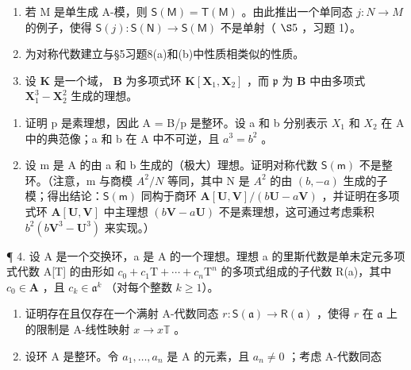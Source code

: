 \BourbakiExercisesSection

\begin{enumerate}
\def\labelenumi{\arabic{enumi}.}
\item
  若 M 是单生成 A-模，则 \(\mathsf{S}(\mathsf{M}) = \mathsf{T}(\mathsf{M})\) 。由此推出一个单同态 \(j: N \to M\) 的例子，使得 \(\mathsf{S}(j): \mathsf{S}(\mathsf{N}) \to \mathsf{S}(\mathsf{M})\) 不是单射（ \(\S 5\) ，习题 1）。
\item
  为对称代数建立与§5习题8(a)和(b)中性质相类似的性质。
\item
  设 \(\mathbf{K}\) 是一个域， \(\mathbf{B}\) 为多项式环 \(\mathbf{K}[\mathbf{X}_1, \mathbf{X}_2]\) ，而 \(\mathfrak{p}\) 为 \(\mathbf{B}\) 中由多项式 \(\mathbf{X}_1^3 - \mathbf{X}_2^2\) 生成的理想。
\end{enumerate}

\begin{enumerate}
\def\labelenumi{(\alph{enumi})}
\item
  证明 p 是素理想，因此 A = B/p 是整环。设 a 和 b 分别表示 \(X_{1}\) 和 \(X_{2}\) 在 A 中的典范像；a 和 b 在 A 中不可逆，且 \(a^{3} = b^{2}\) 。
\item
  设 m 是 A 的由 a 和 b 生成的（极大）理想。证明对称代数 \(\mathsf{S}(\mathsf{m})\) 不是整环。（注意，m 与商模 \(A^{2}/N\) 等同，其中 N 是 \(A^{2}\) 的由 \((b, -a)\) 生成的子模；得出结论：\(\mathsf{S}(\mathsf{m})\) 同构于商环 \(\mathbf{A}[\mathbf{U}, \mathbf{V}]/(b\mathbf{U} - a\mathbf{V})\) ，并证明在多项式环 \(\mathbf{A}[\mathbf{U}, \mathbf{V}]\) 中主理想 \((b\mathbf{V} - a\mathbf{U})\) 不是素理想，这可通过考虑乘积 \(b^{2}(b\mathbf{V}^{3} - \mathbf{U}^{3})\) 来实现。）
\end{enumerate}

¶ 4. 设 A 是一个交换环，a 是 A 的一个理想。理想 a 的里斯代数是单未定元多项式代数 A{[}T{]} 的由形如 \(c_{0} + c_{1}\mathrm{T} + \cdots + c_{n}\mathrm{T}^{n}\) 的多项式组成的子代数 R(a)，其中 \(c_{0} \in \mathbf{A}\) ，且 \(c_{k} \in \mathfrak{a}^{k}\) （对每个整数 \(k \geqslant 1\)）。

\begin{enumerate}
\def\labelenumi{(\alph{enumi})}
\item
  证明存在且仅存在一个满射 A-代数同态 \(r: \mathsf{S}(\mathfrak{a}) \to \mathsf{R}(\mathfrak{a})\) ，使得 \(r\) 在 \(\mathfrak{a}\) 上的限制是 A-线性映射 \(x \to x\mathbb{T}\) 。
\item
  设环 A 是整环。令 \(a_1, \ldots, a_n\) 是 A 的元素，且 \(a_n \neq 0\) ；考虑 A-代数同态
\end{enumerate}

